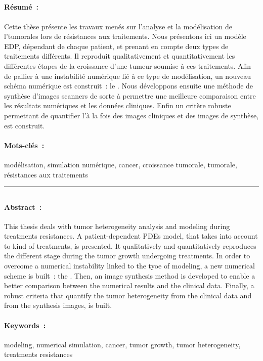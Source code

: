 \documentclass[main.tex]{subfiles}
\begin{document}
\subsection*{\titrefr}
\vfill
\paragraph{Résumé~:} Cette thèse présente les travaux menés sur l'analyse et la modélisation de l'\hetero tumorales lors de résistances aux traitements. 
Nous présentons ici un modèle EDP, dépendant de chaque patient, et prenant en compte deux types de traitements différents. Il reproduit qualitativement et quantitativement les différentes étapes de la croissance d'une tumeur soumise à ces traitements. Afin de pallier à une instabilité numérique lié à ce type de modélisation, un nouveau schéma numérique est construit~: le \twinweno. 
Nous développons ensuite une méthode de synthèse d'images scanners de sorte à permettre une meilleure comparaison entre les résultats numériques et les données cliniques.  
Enfin un critère robuste permettant de quantifier l'\hetero à la fois des images cliniques et des images de synthèse, est construit. 

\paragraph{Mots-clés~:} modélisation, simulation numérique, cancer, croissance tumorale, \hetero tumorale, résistances aux traitements

\vfill
\hrule
\vfill

\subsection*{\titreen}
\vfill
\paragraph{Abstract~:} This thesis deals with tumor heterogeneity analysis and modeling during treatments resistances. 
A patient-dependent PDEs model, that takes into account to kind of treatments, is presented. It qualitatively and quantitatively reproduces the different stage during the tumor growth undergoing treatments. In order to overcome a numerical instability linked to the tyoe of modeling, a new numerical scheme is built~: the \twinweno. 
Then, an image synthesis method is developed to enable a better comparison between the numerical results and the clinical data. 
Finally, a robust criteria that quantify the tumor heterogeneity from the clinical data and from the synthesis images, is built. 

\paragraph{Keywords~:} modeling, numerical simulation, cancer, tumor growth, tumor heterogeneity, treatments resistances
\end{document}

